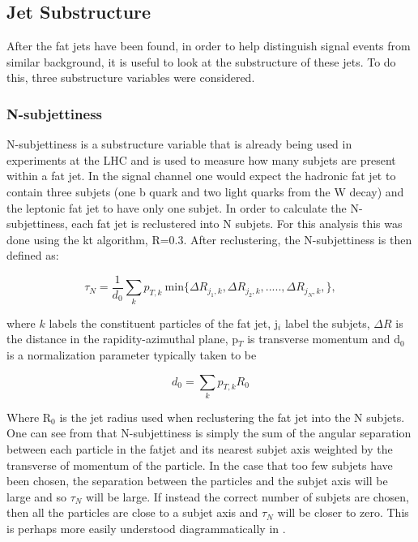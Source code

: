 \subsection{Jet Substructure}
After the fat jets have been found, in order to help distinguish signal events from similar background, it is useful to look at the substructure of these jets. To do this, three substructure variables were considered.

\subsubsection{N-subjettiness}
N-subjettiness is a substructure variable that is already being used in experiments at the LHC and is used to measure how many subjets are present within a fat jet. In the signal channel one would expect the hadronic fat jet to contain three subjets (one b quark and two light quarks from the W decay) and the leptonic fat jet to have only one subjet. In order to calculate the N-subjettiness, each fat jet is reclustered into N subjets. For this analysis this was done using the kt algorithm, R=0.3. After reclustering, the N-subjettiness is then defined as\cite{Thaler:2010tr}:

\begin{equation}
  \label{eq:nsubjet}
  \tau_N=\frac{1}{d_0}\sum\limits_{k}p_{T,k}~\text{min}\{\Delta R_{j_1,k},\Delta R_{j_2,k},.....,\Delta R_{j_N,k},\},
\end{equation}

where $k$ labels the constituent particles of the fat jet, j$_{i}$ label the subjets, $\Delta R$ is the distance in the rapidity-azimuthal plane, p$_{T}$ is transverse momentum and d$_0$ is a normalization parameter typically taken to be

\begin{equation}
  d_0=\sum\limits_{k}p_{T,k}R_0
\end{equation}

Where R$_0$ is the jet radius used when reclustering the fat jet into the N subjets. One can see from  that N-subjettiness is simply the sum of the angular separation between each particle in the fatjet and its nearest subjet axis weighted by the transverse of momentum of the particle. In the case that too few subjets have been chosen, the separation between the particles and the subjet axis will be large and so $\tau_N$ will be large. If instead the correct number of subjets are chosen, then all the particles are close to a subjet axis and $\tau_N$ will be closer to zero. This is perhaps more easily understood diagrammatically in .

